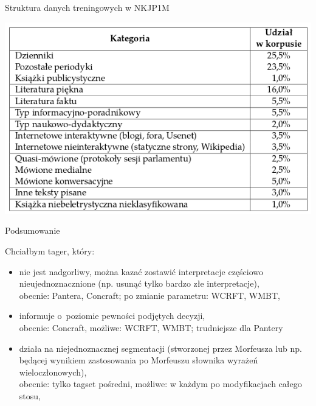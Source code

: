 \documentclass[xcolor=dvipsnames,polish]{beamer}
\begin{document}
\begin{frame}{Struktura danych treningowych w NKJP1M}


  \begin{center}
    \includegraphics[scale=0.7]{img/nkjp1m.png}
  \end{center}


\end{frame}

\begin{frame}{Podsumowanie}
  \vspace{0.5cm}

  Chciałbym tager, który:
   \begin{itemize}
   \item<1-> nie jest nadgorliwy, można kazać zostawić interpretacje częściowo nieujednoznacznione (np. usunąć tylko bardzo złe interpretacje),\\
   \alert{obecnie: Pantera, Concraft; po zmianie parametru: WCRFT, WMBT,}
   \item<2-> informuje o~poziomie pewności podjętych decyzji,\\
   \alert{obecnie: Concraft, możliwe: WCRFT, WMBT; trudniejsze dla Pantery}
   \item<3-> działa na niejednoznacznej segmentacji (stworzonej przez Morfeusza lub np. będącej wynikiem zastosowania po Morfeuszu słownika wyrażeń wieloczłonowych),\\
   \alert{obecnie: tylko tagset pośredni, możliwe: w każdym po modyfikacjach całego stosu,}
   \end{itemize}
\end{frame}
\end{document}
